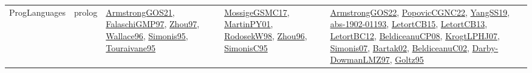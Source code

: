 {\begin{longtable}{llp{6cm}p{6cm}p{6cm}}
ProgLanguages & prolog & \href{papers/ArmstrongGOS21.pdf}{ArmstrongGOS21}\cite{ArmstrongGOS21}, \href{articles/FalaschiGMP97.pdf}{FalaschiGMP97}\cite{FalaschiGMP97}, \href{articles/Zhou97.pdf}{Zhou97}\cite{Zhou97}, \href{articles/Wallace96.pdf}{Wallace96}\cite{Wallace96}, \href{papers/Simonis95.pdf}{Simonis95}\cite{Simonis95}, \href{papers/Touraivane95.pdf}{Touraivane95}\cite{Touraivane95} & \href{papers/MossigeGSMC17.pdf}{MossigeGSMC17}\cite{MossigeGSMC17}, \href{articles/MartinPY01.pdf}{MartinPY01}\cite{MartinPY01}, \href{papers/RodosekW98.pdf}{RodosekW98}\cite{RodosekW98}, \href{papers/Zhou96.pdf}{Zhou96}\cite{Zhou96}, \href{papers/SimonisC95.pdf}{SimonisC95}\cite{SimonisC95} & \href{papers/ArmstrongGOS22.pdf}{ArmstrongGOS22}\cite{ArmstrongGOS22}, \href{papers/PopovicCGNC22.pdf}{PopovicCGNC22}\cite{PopovicCGNC22}, \href{papers/YangSS19.pdf}{YangSS19}\cite{YangSS19}, \href{articles/abs-1902-01193.pdf}{abs-1902-01193}\cite{abs-1902-01193}, \href{articles/LetortCB15.pdf}{LetortCB15}\cite{LetortCB15}, \href{papers/LetortCB13.pdf}{LetortCB13}\cite{LetortCB13}, \href{papers/LetortBC12.pdf}{LetortBC12}\cite{LetortBC12}, \href{papers/BeldiceanuCP08.pdf}{BeldiceanuCP08}\cite{BeldiceanuCP08}, \href{papers/KrogtLPHJ07.pdf}{KrogtLPHJ07}\cite{KrogtLPHJ07}, \href{articles/Simonis07.pdf}{Simonis07}\cite{Simonis07}, \href{papers/Bartak02.pdf}{Bartak02}\cite{Bartak02}, \href{papers/BeldiceanuC02.pdf}{BeldiceanuC02}\cite{BeldiceanuC02}, \href{articles/Darby-DowmanLMZ97.pdf}{Darby-DowmanLMZ97}\cite{Darby-DowmanLMZ97}, \href{papers/Goltz95.pdf}{Goltz95}\cite{Goltz95}\\

\end{longtable}}
